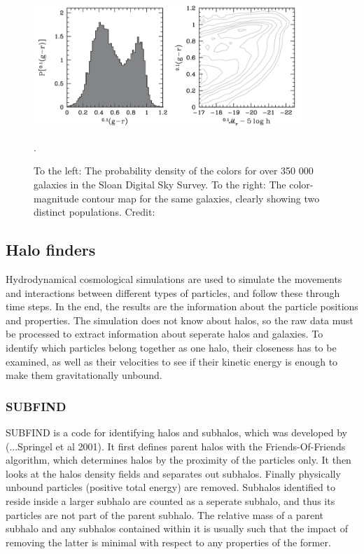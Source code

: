 \begin{figure}
    \centering
    \includegraphics[width=0.9\textwidth]{images/color_bimodality.png}
    \caption{To the left: The probability density of the colors for over 350 000 galaxies in the Sloan Digital Sky Survey. To the right: The color-magnitude contour map for the same galaxies, clearly showing two distinct populations. Credit: \textcite{Mo2010}}.
    \label{color_bimodality}
\end{figure}

\subsection{Halo finders}

Hydrodynamical cosmological simulations are used to simulate the movements and interactions between different types of particles, and follow these through time steps. In the end, the results are the information about the particle positions and properties. The simulation does not know about halos, so the raw data must be processed to extract information about seperate halos and galaxies. To identify which particles belong together as one halo, their closeness has to be examined, as well as their velocities to see if their kinetic energy is enough to make them gravitationally unbound.

\subsubsection{SUBFIND}
SUBFIND is a code for identifying halos and subhalos, which was developed by (...Springel et al 2001). It first defines parent halos with the Friends-Of-Friends algorithm, which determines halos by the proximity of the particles only. It then looks at the halos density fields and separates out subhalos. Finally physically unbound particles (positive total energy) are removed. Subhalos identified to reside inside a larger subhalo are counted as a seperate subhalo, and thus its particles are not part of the parent subhalo. The relative mass of a parent subhalo and any subhalos contained within it is usually such that the impact of removing the latter is minimal with respect to any properties of the former.
